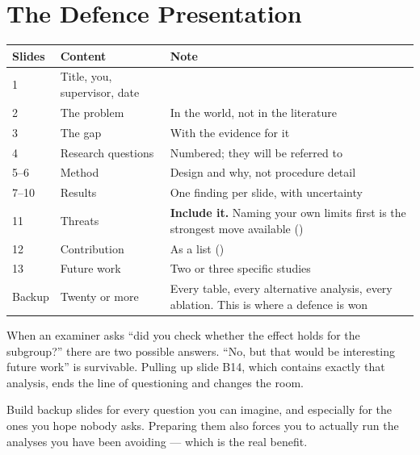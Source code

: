 \section{The Defence Presentation}

\begin{center}
\small
\begin{tabular}{@{}L{1.6cm}L{3.6cm}L{8.7cm}@{}}
\toprule
\textbf{Slides} & \textbf{Content} & \textbf{Note} \\
     & Title, you, supervisor, date & \\
2     & The problem                  & In the world, not in the literature \\
3     & The gap                      & With the evidence for it \\
4     & Research questions           & Numbered; they will be referred to \\
5--6  & Method                       & Design and why, not procedure detail \\
7--10 & Results                      & One finding per slide, with uncertainty \\
11    & Threats                      & \textbf{Include it.} Naming your own
                                       limits first is the strongest move
                                       available () \\
12    & Contribution                 & As a list () \\
13    & Future work                  & Two or three specific studies \\
\midrule
Backup & Twenty or more             & Every table, every alternative analysis,
                                      every ablation. This is where a defence
                                      is won \\
\bottomrule
\end{tabular}
\end{center}

\begin{alertbox}
When an examiner asks ``did you check whether the effect holds for the
subgroup?'' there are two possible answers. ``No, but that would be interesting
future work'' is survivable. Pulling up slide B14, which contains exactly that
analysis, ends the line of questioning and changes the room.

\medskip
Build backup slides for every question you can imagine, and especially for the
ones you hope nobody asks. Preparing them also forces you to actually run the
analyses you have been avoiding --- which is the real benefit.
\end{alertbox}


